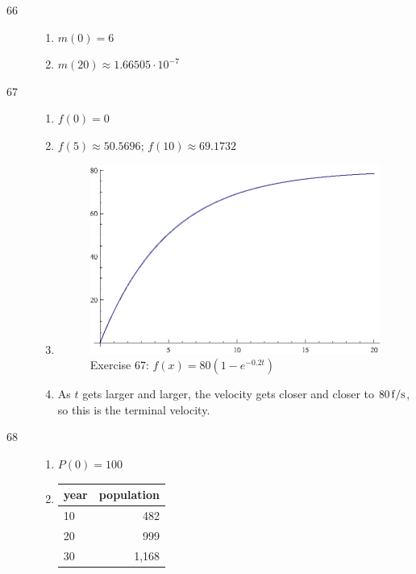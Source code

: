 \documentclass{exam}
\begin{document}
\begin{description}
      \item[66]
        \begin{enumerate}[a]
          \item $m(0) = 6$
          \item $m(20) \approx 1.66505 \cdot 10^{-7}$
        \end{enumerate}

      \item[67]
        \begin{enumerate}[a]
          \item $f(0) = 0$

          \item $f(5) \approx 50.5696$; $f(10) \approx 69.1732$

          \item
            \begin{figure}[H]
              \centering
              \includegraphics[scale=1.0]{exercise67.eps}
              \caption*{Exercise 67: $f(x) = 80 \left( 1 - e^{-0.2t} \right)$}
            \end{figure}

          \item As $t$ gets larger and larger, the velocity gets closer and closer to $\unit[80]{f/s}$, so this is the
            terminal velocity.

        \end{enumerate}

      \item[68]
        \begin{enumerate}[a]
          \item $P(0) = 100$

          \item
            \begin{tabular}[H]{lr}
              \toprule
              year & population \\
              \midrule
              10   & 482 \\
              20   & 999 \\
              30   & 1,168 \\
              \bottomrule
            \end{tabular}


\end{enumerate}
\end{description}
\end{document}
